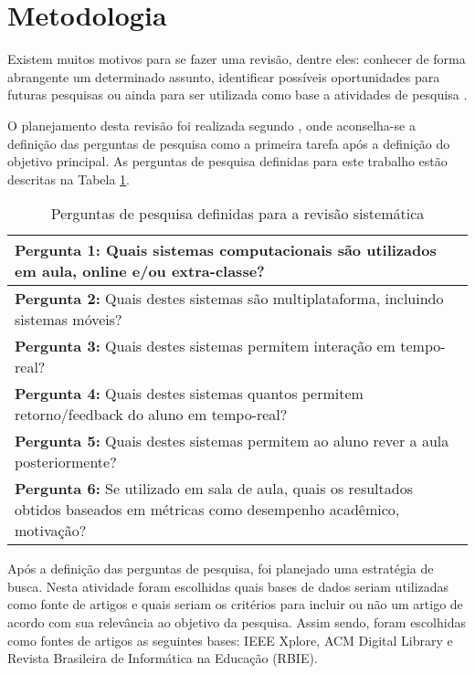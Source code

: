 \section{Metodologia}


Existem muitos motivos para se fazer uma revisão, dentre eles: conhecer de forma abrangente um determinado assunto, identificar possíveis oportunidades para futuras pesquisas ou ainda para ser utilizada como base a atividades de pesquisa \cite{kitchenham:2004}. 

O planejamento desta revisão foi realizada segundo \cite{kitchenham:2004}, onde aconselha-se a definição das perguntas de pesquisa como a primeira tarefa após a definição do objetivo principal. As perguntas de pesquisa definidas para este trabalho estão descritas na Tabela \ref{tab:perguntas}.

\bgroup
\def\arraystretch{1.5} %
\begin{table}[h]{} %
\centering
\caption{Perguntas de pesquisa definidas para a revisão sistemática}
\begin{tabular}{|p{14cm}|} \hline
\textbf{Pergunta 1:} Quais sistemas computacionais são utilizados em aula, online e/ou extra-classe? \\ \hline
\textbf{Pergunta 2:} Quais destes sistemas são multiplataforma, incluindo sistemas móveis? \\ \hline
\textbf{Pergunta 3:} Quais destes sistemas permitem interação em tempo-real? \\ \hline
\textbf{Pergunta 4:} Quais destes sistemas quantos permitem retorno/feedback do aluno em tempo-real? \\ \hline
\textbf{Pergunta 5:} Quais destes sistemas permitem ao aluno rever a aula posteriormente? \\ \hline
\textbf{Pergunta 6:} Se utilizado em sala de aula, quais os resultados obtidos baseados em métricas como desempenho acadêmico, motivação? \\ \hline
\end{tabular}
\label{tab:perguntas}
\end{table}
\egroup


Após a definição das perguntas de pesquisa, foi planejado uma estratégia de busca. Nesta atividade foram escolhidas quais bases de dados seriam utilizadas como fonte de artigos e quais seriam os critérios para incluir ou não um artigo de acordo com sua relevância ao objetivo da pesquisa. Assim sendo, foram escolhidas como fontes de artigos as seguintes bases: IEEE Xplore, ACM Digital Library e Revista Brasileira de Informática na Educação (RBIE).

